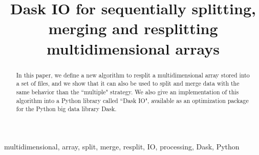 \documentclass[conference]{IEEEtran}
\begin{document}
\title{ Dask IO for sequentially splitting, merging and resplitting multidimensional arrays }

\author{
\and
{}
\and
{}
}

\maketitle

\begin{abstract}
In this paper, we define a new algorithm to resplit a multidimensional array stored into a set of files, and we show that it can also be used to split and merge data with the same behavior than the ``multiple" strategy. We also give an implementation of this algorithm into a Python library called ``Dask IO", available as an optimization package for the Python big data library Dask.
\end{abstract}

\begin{IEEEkeywords}
multidimensional, array, split, merge, resplit, IO, processing, Dask, Python
\end{IEEEkeywords}

\end{document}
